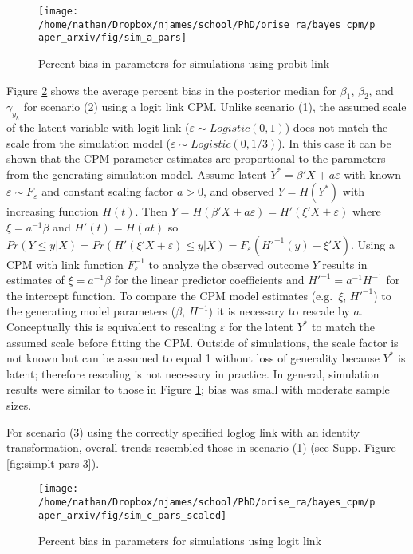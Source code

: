 \documentclass[
]{article}
\begin{document}
\begin{figure}

{\centering \texttt{[image: /home/nathan/Dropbox/njames/school/PhD/orise\_ra/bayes\_cpm/paper\_arxiv/fig/sim\_a\_pars]} 

}

\caption{Percent bias in parameters for simulations using probit link}\label{fig:simplt-pars-1}
\end{figure}

Figure \ref{fig:simplt-pars-2} shows the average percent bias in the posterior median for \(\beta_1\), \(\beta_2\), and \(\gamma_{y_k}\) for scenario (2) using a logit link CPM. Unlike scenario (1), the assumed scale of the latent variable with logit link (\(\varepsilon \sim Logistic(0,1)\)) does not match the scale from the simulation model (\(\varepsilon \sim Logistic(0,1/3)\)). In this case it can be shown that the CPM parameter estimates are proportional to the parameters from the generating simulation model. Assume latent \(Y^*=\beta'X + a\varepsilon\) with known \(\varepsilon \sim F_{\varepsilon}\) and constant scaling factor \(a>0\), and observed \(Y=H(Y^*)\) with increasing function \(H(t)\). Then \(Y=H(\beta'X+a\varepsilon)=H'(\xi'X+\varepsilon)\) where \(\xi=a^{-1}\beta\) and \(H'(t)=H(at)\) so \(Pr(Y \le y|X)=Pr(H'(\xi'X+\varepsilon)\le y|X)=F_{\varepsilon}(H'^{-1}(y)-\xi'X)\). Using a CPM with link function \(F_{\varepsilon}^{-1}\) to analyze the observed outcome \(Y\) results in estimates of \(\xi=a^{-1}\beta\) for the linear predictor coefficients and \(H'^{-1}=a^{-1}H^{-1}\) for the intercept function. To compare the CPM model estimates (e.g.~\(\xi\), \(H'^{-1}\)) to the generating model parameters (\(\beta\), \(H^{-1}\)) it is necessary to rescale by \(a\). Conceptually this is equivalent to rescaling \(\varepsilon\) for the
latent \(Y^*\) to match the assumed scale before fitting the CPM. Outside of simulations, the scale factor is not known but can be assumed to equal 1 without loss of generality because \(Y^*\) is latent; therefore rescaling is not necessary in practice. In general, simulation results were similar to those in Figure \ref{fig:simplt-pars-1}; bias was small with moderate sample sizes.

For scenario (3) using the correctly specified loglog link with an identity transformation, overall trends resembled those in scenario (1) (see Supp. Figure \ref{fig:simplt-pars-3}).

\begin{figure}

{\centering \texttt{[image: /home/nathan/Dropbox/njames/school/PhD/orise\_ra/bayes\_cpm/paper\_arxiv/fig/sim\_c\_pars\_scaled]} 

}

\caption{Percent bias in parameters for simulations using logit link}\label{fig:simplt-pars-2}
\end{figure}
\end{document}
